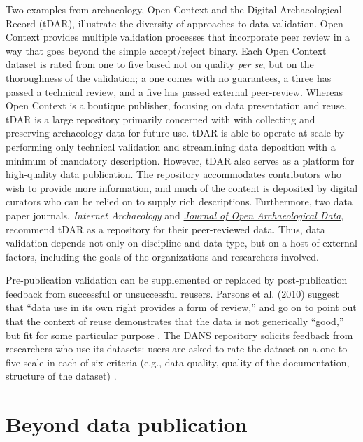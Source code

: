 \documentclass[10pt,a4paper,twocolumn]{article}
\begin{document}
{{Two examples from archaeology, Open Context and the Digital Archaeological Record (tDAR), illustrate the diversity of approaches to data validation.
Open Context provides multiple validation processes that incorporate peer review in a way that goes beyond the simple accept/reject binary\cite{kansa_we_2013}.
Each Open Context dataset is rated from one to five based not on quality \emph{per se}, but on the thoroughness of the validation; a one comes with no guarantees, a three has passed a technical review, and a five has passed external peer-review.
Whereas Open Context is a boutique publisher, focusing on data presentation and reuse, tDAR is a large repository primarily concerned with with collecting and preserving archaeology data for future use.
tDAR is able to operate at scale by performing only technical validation and streamlining data deposition with a minimum of mandatory description.
However, tDAR also serves as a platform for high-quality data publication.
The repository accommodates contributors who wish to provide more information, and much of the content is deposited by digital curators who can be relied on to supply rich descriptions.
Furthermore, two data paper journals, \emph{Internet Archaeology} and \href{http://openarchaeologydata.metajnl.com/}{\emph{Journal of Open Archaeological Data}}, recommend tDAR as a repository for their peer-reviewed data.
Thus, data validation depends not only on discipline and data type, but on a host of external factors, including the goals of the organizations and researchers involved.

Pre-publication validation can be supplemented or replaced by post-publication feedback from successful or unsuccessful reusers.
Parsons et al. (2010) suggest that ``data use in its own right provides a form of review,'' and go on to point out that the context of reuse demonstrates that the data is not generically ``good,'' but fit for some particular purpose \cite{parsons_data_2010}.
The DANS repository solicits feedback from researchers who use its datasets: users are asked to rate the dataset on a one to five scale in each of six criteria (e.g., data quality, quality of the documentation, structure of the dataset) \cite{grootveld_data_2011,grootveld_peer-reviewed_2012}.


\section*{Beyond data publication}\label{beyond-data-publication}

}}
\end{document}

